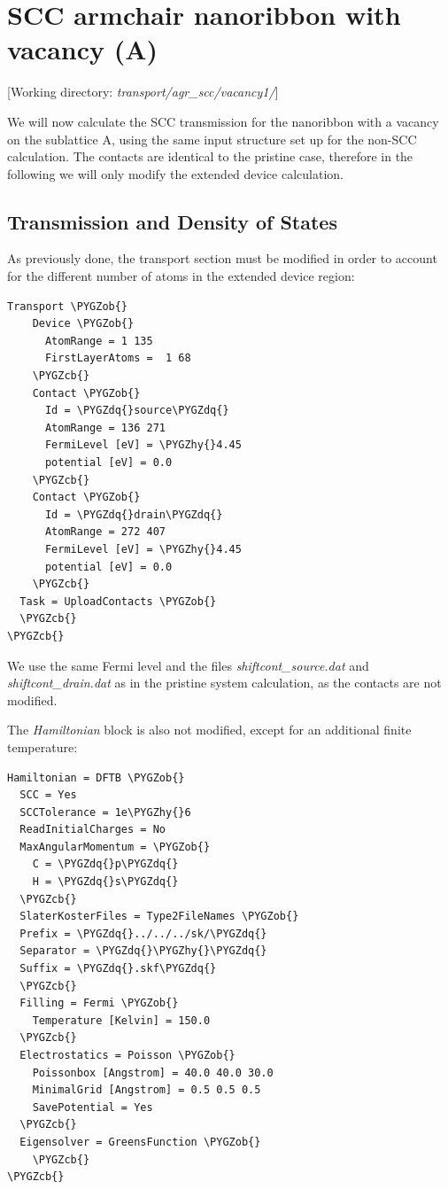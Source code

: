 \documentclass[a4paper,11pt,english]{sphinxmanual}
\def\PYGZob{\char`\{}
\def\PYGZcb{\char`\}}
\def\PYGZhy{\char`\-}
\def\PYGZdq{\char`\"}
\begin{document}
{{\section{SCC armchair nanoribbon with vacancy (A)}
\label{transport:scc-armchair-nanoribbon-with-vacancy-a}
{[}Working directory: \emph{transport/agr\_scc/vacancy1/}{]}

We will now calculate the SCC transmission for the nanoribbon with a
vacancy on the sublattice A, using the same input structure set up for
the non-SCC calculation. The contacts are identical to the pristine
case, therefore in the following we will only modify the extended
device calculation.


\subsection{Transmission and Density of States}
\label{transport:id4}
As previously done, the transport section must be modified in order to
account for the different number of atoms in the extended device
region:

\begin{Verbatim}[commandchars=\\\{\}]
Transport \PYGZob{}
    Device \PYGZob{}
      AtomRange = 1 135
      FirstLayerAtoms =  1 68
    \PYGZcb{}
    Contact \PYGZob{}
      Id = \PYGZdq{}source\PYGZdq{}
      AtomRange = 136 271
      FermiLevel [eV] = \PYGZhy{}4.45
      potential [eV] = 0.0
    \PYGZcb{}
    Contact \PYGZob{}
      Id = \PYGZdq{}drain\PYGZdq{}
      AtomRange = 272 407
      FermiLevel [eV] = \PYGZhy{}4.45
      potential [eV] = 0.0
    \PYGZcb{}
  Task = UploadContacts \PYGZob{}
  \PYGZcb{}
\PYGZcb{}
\end{Verbatim}

We use the same Fermi level and the files \emph{shiftcont\_source.dat} and
\emph{shiftcont\_drain.dat} as in the pristine system calculation, as the
contacts are not modified.

The \emph{Hamiltonian} block is also not modified, except for an additional
finite temperature:

\begin{Verbatim}[commandchars=\\\{\}]
Hamiltonian = DFTB \PYGZob{}
  SCC = Yes
  SCCTolerance = 1e\PYGZhy{}6
  ReadInitialCharges = No
  MaxAngularMomentum = \PYGZob{}
    C = \PYGZdq{}p\PYGZdq{}
    H = \PYGZdq{}s\PYGZdq{}
  \PYGZcb{}
  SlaterKosterFiles = Type2FileNames \PYGZob{}
  Prefix = \PYGZdq{}../../../sk/\PYGZdq{}
  Separator = \PYGZdq{}\PYGZhy{}\PYGZdq{}
  Suffix = \PYGZdq{}.skf\PYGZdq{}
  \PYGZcb{}
  Filling = Fermi \PYGZob{}
    Temperature [Kelvin] = 150.0
  \PYGZcb{}
  Electrostatics = Poisson \PYGZob{}
    Poissonbox [Angstrom] = 40.0 40.0 30.0
    MinimalGrid [Angstrom] = 0.5 0.5 0.5
    SavePotential = Yes
  \PYGZcb{}
  Eigensolver = GreensFunction \PYGZob{}
    \PYGZcb{}
\PYGZcb{}
\end{Verbatim}

}}
\end{document}
